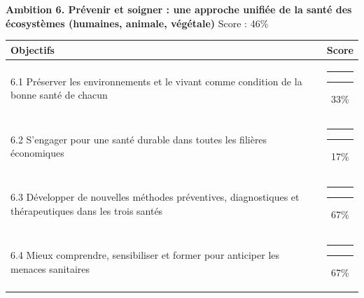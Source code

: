 \documentclass[
]{article}
\begin{document}
\needspace{8cm}
\vspace{0.8cm}

\textbf{\fontsize{10pt}{12pt}\selectfont Ambition 6. Prévenir et soigner : une approche unifiée de la santé des écosystèmes (humaines, animale, végétale)}
\hfill \small Score : 46\%

\begin{center}
\begin{tabular}{p{10cm}c}
\toprule
Objectifs & Score \\
\midrule
6.1 Préserver les environnements et le vivant comme condition de la bonne santé de chacun & {\color[HTML]{EB6E26}\rule{1.98cm}{3pt}}{\color{gray}\rule{4.02cm}{3pt}}\hspace{0.3cm}33\% \\
6.2 S’engager pour une santé durable dans toutes les filières économiques & {\color[HTML]{CC1414}\rule{1.02cm}{3pt}}{\color{gray}\rule{4.98cm}{3pt}}\hspace{0.3cm}17\% \\
6.3 Développer de nouvelles méthodes préventives, diagnostiques et thérapeutiques dans les trois santés & {\color[HTML]{6E9E62}\rule{4.02cm}{3pt}}{\color{gray}\rule{1.98cm}{3pt}}\hspace{0.3cm}67\% \\
6.4 Mieux comprendre, sensibiliser et former pour anticiper les menaces sanitaires & {\color[HTML]{6E9E62}\rule{4.02cm}{3pt}}{\color{gray}\rule{1.98cm}{3pt}}\hspace{0.3cm}67\% \\
\bottomrule
\end{tabular}
\end{center}
\end{document}
